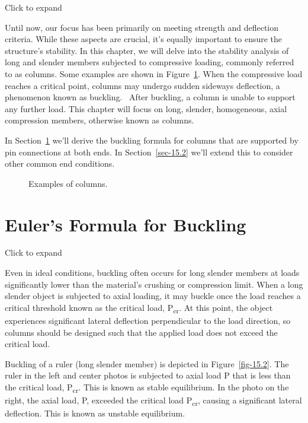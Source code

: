 \documentclass[
  letterpaper,
  DIV=11,
  numbers=noendperiod]{scrreprt}
\theoremstyle{definition}
\theoremstyle{remark}
\begin{document}

Click to expand

Until now, our focus has been primarily on meeting strength and
deflection criteria. While these aspects are crucial, it's equally
important to ensure the structure's stability. In this chapter, we will
delve into the stability analysis of long and slender members subjected
to compressive loading, commonly referred to as columns. Some examples
are shown in Figure~\ref{fig-15.1}. When the compressive load reaches a
critical point, columns may undergo sudden sideways deflection, a
phenomenon known as buckling.~ After buckling, a column is unable to
support any further load. This chapter will focus on long, slender,
homogeneous, axial compression members, otherwise known as columns.

In Section~\ref{sec-15.1} we'll derive the buckling formula for columns
that are supported by pin connections at both ends. In
Section~\ref{sec-15.2} we'll extend this to consider other common end
conditions.

\begin{figure}


\caption{\label{fig-15.1}Examples of columns.}

\end{figure}%

\section{Euler's Formula for Buckling}\label{sec-15.1}

Click to expand

Even in ideal conditions, buckling often occurs for long slender members
at loads significantly lower than the material's crushing or compression
limit. When a long slender object is subjected to axial loading, it may
buckle once the load reaches a critical threshold known as the critical
load, P\textsubscript{cr}. At this point, the object experiences
significant lateral deflection perpendicular to the load direction, so
columns should be designed such that the applied load does not exceed
the critical load.

Buckling of a ruler (long slender member) is depicted in
Figure~\ref{fig-15.2}. The ruler in the left and center photos is
subjected to axial load P that is less than the critical load,
P\textsubscript{cr}. This is known as stable equilibrium. In the photo
on the right, the axial load, P, exceeded the critical load
P\textsubscript{cr}, causing a significant lateral deflection. This is
known as unstable equilibrium.
\end{document}
